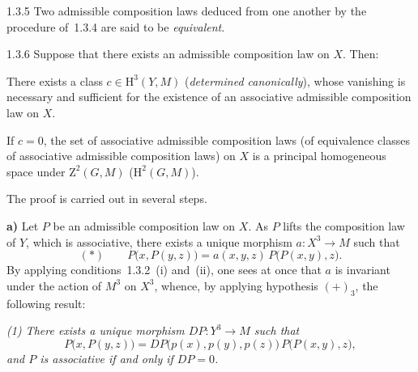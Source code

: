 \begin{definition}{1.3.5}
\label{III.1.3.5}
Two admissible composition laws deduced from one another by the procedure
of~1.3.4 are said to be
\emph{equivalent}.{\renewcommand{\thefootnote}{(49)}}
\end{definition}

\begin{proposition}{1.3.6}
\label{III.1.3.6}
Suppose that there exists an admissible composition law on \(X\).
Then:
\begin{enumeratei}
\item There exists a class \(c\in\mathrm{H}^{3}(Y,M)\) (\emph{determined
canonically}), whose vanishing is necessary and sufficient for the
existence of an associative admissible composition law on \(X\).
\item If \(c=0\), the set of associative admissible composition laws
(\resp of equivalence classes of associative admissible composition laws)
on \(X\) is a principal homogeneous space under \(\mathrm{Z}^{2}(G,M)\)
(\resp \(\mathrm{H}^{2}(G,M)\)).
\end{enumeratei}
\end{proposition}

The proof is carried out in several steps.

\textbf{a)} Let \(P\) be an admissible composition law on \(X\). As \(P\)
lifts the composition law of \(Y\), which is associative, there exists a
unique morphism \(a\colon X^{3}\to M\) such that
\[
(*)\qquad
P\bigl(x,P(y,z)\bigr)=a(x,y,z)\,P\bigl(P(x,y),z\bigr).
\]
By applying conditions~1.3.2~(i) and~(ii), one sees at once that \(a\) is
invariant under the action of \(M^{3}\) on
\(X^{3}\),{\renewcommand{\thefootnote}{(50)}}
whence, by applying hypothesis \((+)_3\), the following result:

\emph{(1) There exists a unique morphism \(DP\colon Y^{3}\to M\) such that}
\[
P\bigl(x,P(y,z)\bigr)
=DP\bigl(p(x),p(y),p(z)\bigr)\,P\bigl(P(x,y),z\bigr),
\]
\emph{and \(P\) is associative if and only if \(DP=0\).}

